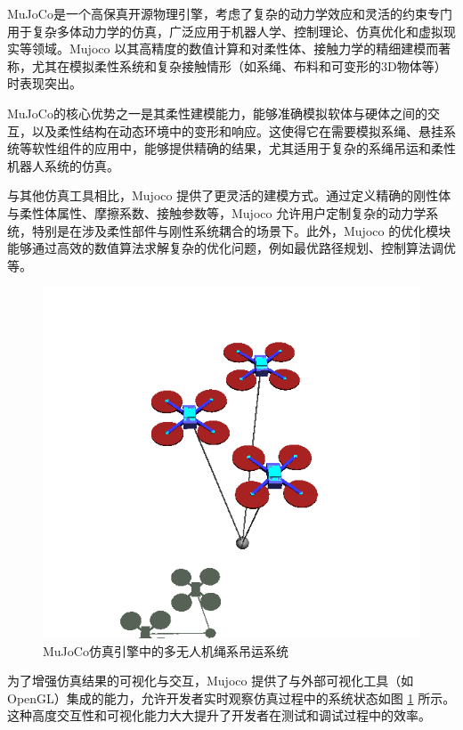 \documentclass[lang=chs, degree=master, blindreview=false, winfonts=true]{yanputhesis}
\begin{document}
MuJoCo是一个高保真开源物理引擎，考虑了复杂的动力学效应和灵活的约束专门用于复杂多体动力学的仿真，广泛应用于机器人学、控制理论、仿真优化和虚拟现实等领域。Mujoco 以其高精度的数值计算和对柔性体、接触力学的精细建模而著称，尤其在模拟柔性系统和复杂接触情形（如系绳、布料和可变形的3D物体等）时表现突出。

MuJoCo的核心优势之一是其柔性建模能力，能够准确模拟软体与硬体之间的交互，以及柔性结构在动态环境中的变形和响应。这使得它在需要模拟系绳、悬挂系统等软性组件的应用中，能够提供精确的结果，尤其适用于复杂的系绳吊运和柔性机器人系统的仿真。

与其他仿真工具相比，Mujoco 提供了更灵活的建模方式。通过定义精确的刚性体与柔性体属性、摩擦系数、接触参数等，Mujoco 允许用户定制复杂的动力学系统，特别是在涉及柔性部件与刚性系统耦合的场景下。此外，Mujoco 的优化模块能够通过高效的数值算法求解复杂的优化问题，例如最优路径规划、控制算法调优等。

\begin{figure}[hbt!]
	\centering
	\includegraphics[width=34pc]{picture/5_3.png} 
	\caption{MuJoCo仿真引擎中的多无人机绳系吊运系统} 
	\label{5_3}
\end{figure}

为了增强仿真结果的可视化与交互，Mujoco 提供了与外部可视化工具（如 OpenGL）集成的能力，允许开发者实时观察仿真过程中的系统状态如图 \ref{5_3} 所示。这种高度交互性和可视化能力大大提升了开发者在测试和调试过程中的效率。
\end{document}
